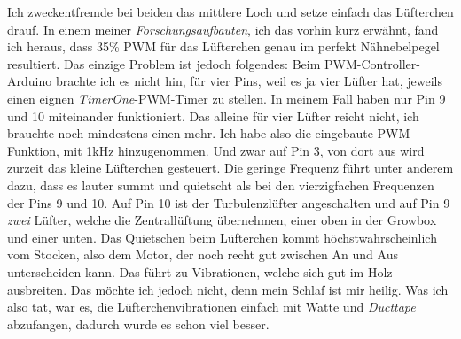 \documentclass[12pt,titlepage,a4paper]{article}
\begin{document}
Ich zweckentfremde  bei beiden das mittlere Loch und setze einfach das Lüfterchen drauf. In einem meiner \textit{Forschungsaufbauten}, ich das vorhin kurz erwähnt, fand ich heraus, dass 35\% PWM für das Lüfterchen genau im perfekt Nähnebelpegel resultiert. Das einzige Problem ist jedoch folgendes: Beim PWM-Controller-Arduino brachte ich es nicht hin, für vier Pins, weil es ja vier Lüfter hat, jeweils einen eignen \textit{TimerOne}-PWM-Timer zu stellen. In meinem Fall haben nur Pin 9 und 10 miteinander funktioniert. Das alleine für vier Lüfter reicht nicht, ich brauchte noch mindestens einen mehr. Ich habe also die eingebaute PWM-Funktion, mit 1kHz hinzugenommen. Und zwar auf Pin 3, von dort aus wird zurzeit das kleine Lüfterchen gesteuert. Die geringe Frequenz führt unter anderem dazu, dass es lauter summt und quietscht als bei den vierzigfachen Frequenzen der Pins 9 und 10. Auf Pin 10 ist der Turbulenzlüfter angeschalten und auf Pin 9 \textit{zwei} Lüfter, welche die Zentrallüftung übernehmen, einer oben in der Growbox und einer unten. Das Quietschen beim Lüfterchen kommt höchstwahrscheinlich vom Stocken, also dem Motor, der noch recht gut zwischen An und Aus unterscheiden kann. Das führt zu Vibrationen, welche sich gut im Holz ausbreiten. Das möchte ich jedoch nicht, denn mein Schlaf ist mir heilig. Was ich also tat, war es, die Lüfterchenvibrationen einfach mit Watte und \textit{Ducttape} abzufangen, dadurch wurde es schon viel besser.
\end{document}
